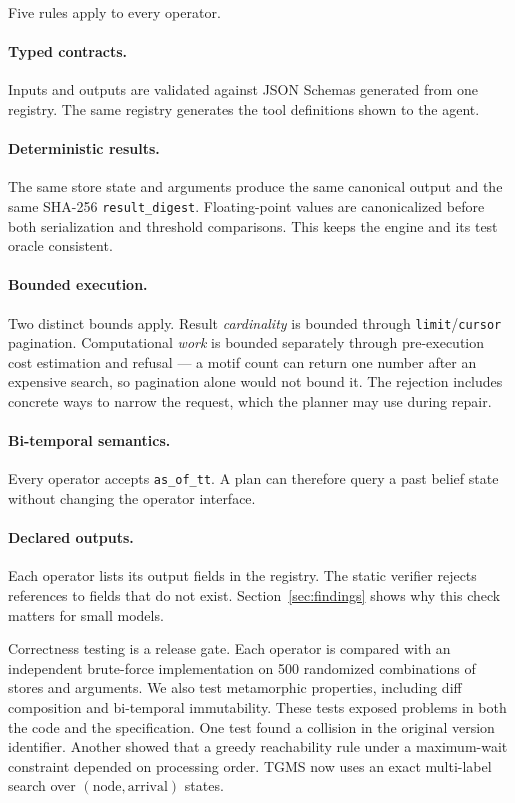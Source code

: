 \documentclass[11pt]{article}
\begin{document}
Five rules apply to every operator.

\paragraph{Typed contracts.}
Inputs and outputs are validated against JSON Schemas generated from one
registry. The same registry generates the tool definitions shown to the
agent.

\paragraph{Deterministic results.}
The same store state and arguments produce the same canonical output and
the same SHA-256 \texttt{result\_digest}. Floating-point values are
canonicalized before both serialization and threshold comparisons. This
keeps the engine and its test oracle consistent.

\paragraph{Bounded execution.}
Two distinct bounds apply. Result \emph{cardinality} is bounded through
\texttt{limit}/\texttt{cursor} pagination. Computational \emph{work}
is bounded separately through pre-execution cost estimation and refusal
--- a motif count can return one number after an expensive search, so
pagination alone would not bound it. The rejection includes concrete
ways to narrow the request, which
the planner may use during repair.

\paragraph{Bi-temporal semantics.}
Every operator accepts \texttt{as\_of\_tt}. A plan can therefore query a
past belief state without changing the operator interface.

\paragraph{Declared outputs.}
Each operator lists its output fields in the registry. The static verifier
rejects references to fields that do not exist. Section~\ref{sec:findings}
shows why this check matters for small models.

Correctness testing is a release gate. Each operator is compared with an
independent brute-force implementation on 500 randomized combinations of
stores and arguments. We also test metamorphic properties, including diff
composition and bi-temporal immutability. These tests exposed problems in
both the code and the specification. One test found a collision in the
original version identifier. Another showed that a greedy reachability
rule under a maximum-wait constraint depended on processing order. TGMS
now uses an exact multi-label search over
$(\text{node},\text{arrival})$ states.
\end{document}
